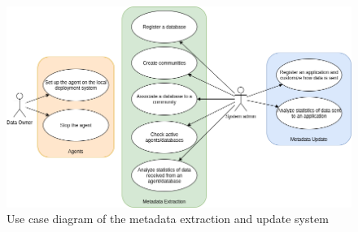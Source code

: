 \begin{figure}[H]
    \center
    \includegraphics[width=\textwidth]{use-cases}
    \caption{Use case diagram of the metadata extraction and update system}
    \label{fig:use-cases}
\end{figure}

